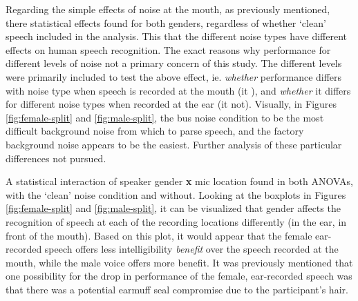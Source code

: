 Regarding the simple effects of noise at the mouth, as previously mentioned, there \DIFdelbegin {}\DIFdelend \DIFaddbegin {}\DIFaddend statistical effects found for both genders, regardless of whether `clean' speech \DIFdelbegin {}\DIFdelend \DIFaddbegin {}\DIFaddend included in the analysis.  This \DIFdelbegin {}\DIFdelend \DIFaddbegin {}\DIFaddend that the different noise types have different effects on human speech recognition.  The exact reasons why performance \DIFdelbegin {}\DIFdelend \DIFaddbegin {}\DIFaddend for different levels of noise \DIFdelbegin {}\DIFdelend \DIFaddbegin {}\DIFaddend not a primary concern of this study.  The different levels were primarily included to test the above effect, ie. \textit{whether} performance differs with noise type when speech is recorded at the mouth (it \DIFdelbegin {}\DIFdelend \DIFaddbegin {}\DIFaddend ), and \textit{whether} it differs for different noise types when recorded at the ear (it \DIFdelbegin {}\DIFdelend \DIFaddbegin {}\DIFaddend not).   Visually, in Figures \ref{fig:female-split} and \ref{fig:male-split}, the bus noise condition \DIFdelbegin {}\DIFdelend \DIFaddbegin {}\DIFaddend to be the most difficult background noise from which to parse speech, and the factory background noise appears to be the easiest.  Further analysis of these particular differences \DIFdelbegin {}\DIFdelend \DIFaddbegin {}\DIFaddend not pursued.



A statistical interaction of speaker gender \textbf{x} mic location \DIFdelbegin {}\DIFdelend \DIFaddbegin {}\DIFaddend found in both ANOVAs, with the `clean' noise condition and without.  
Looking at the boxplots in Figures \ref{fig:female-split} and \ref{fig:male-split}, it can be visualized that gender affects the recognition of speech at each of the recording locations differently (in the ear, in front of the mouth).  Based on this plot, it would appear that the female ear-recorded speech offers less intelligibility \textit{benefit} over the speech recorded at the mouth, while the male voice offers more benefit. It was previously mentioned that one possibility for the drop in performance of the female, ear-recorded speech was that there was a potential earmuff seal compromise due to the participant's hair.  


